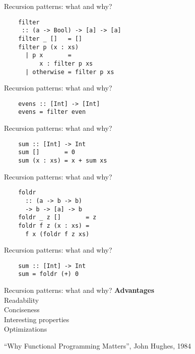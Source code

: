 \documentclass[20pt]{beamer}
\newcommand{\vspaced}{
    \vspace{5mm}
}
\begin{document}
\begin{frame}[fragile]{Recursion patterns: what and why?}
    \begin{lstlisting}
    filter
     :: (a -> Bool) -> [a] -> [a]
    filter _ []   = []
    filter p (x : xs)
      | p x       =
          x : filter p xs
      | otherwise = filter p xs
    \end{lstlisting}
\end{frame}

\begin{frame}[fragile]{Recursion patterns: what and why?}
    \begin{lstlisting}
    evens :: [Int] -> [Int]
    evens = filter even
    \end{lstlisting}
\end{frame}

\begin{frame}[fragile]{Recursion patterns: what and why?}
    \begin{lstlisting}
    sum :: [Int] -> Int
    sum []       = 0
    sum (x : xs) = x + sum xs
    \end{lstlisting}
\end{frame}

\begin{frame}[fragile]{Recursion patterns: what and why?}
    \begin{lstlisting}
    foldr
      :: (a -> b -> b)
      -> b -> [a] -> b
    foldr _ z []       = z
    foldr f z (x : xs) =
      f x (foldr f z xs)
    \end{lstlisting}
\end{frame}

\begin{frame}[fragile]{Recursion patterns: what and why?}
    \begin{lstlisting}
    sum :: [Int] -> Int
    sum = foldr (+) 0
    \end{lstlisting}
\end{frame}

\begin{frame}{Recursion patterns: what and why?}
    \textbf{Advantages} \\
    Readability \\
    Conciseness \\
    Interesting properties \\
    Optimizations \\
    \vspaced
    \small{``Why Functional Programming Matters'', John Hughes, 1984}
\end{frame}
\end{document}
